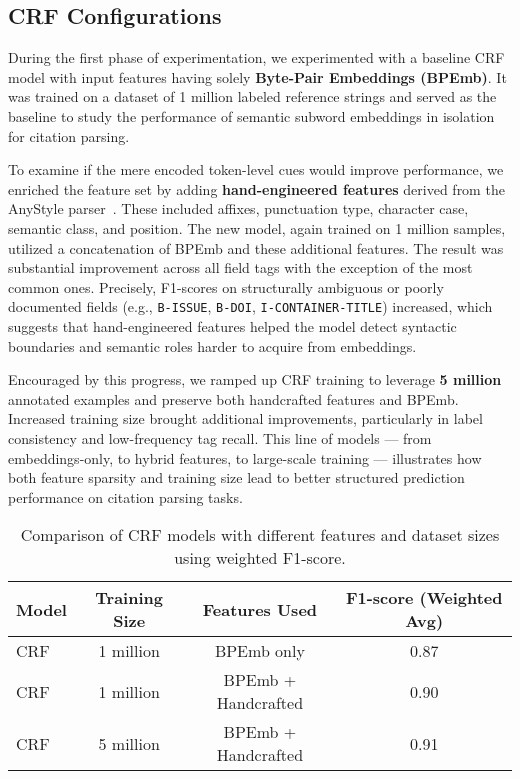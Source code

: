 \subsection{CRF Configurations}
During the first phase of experimentation, we experimented with a baseline CRF model with input features having solely \textbf{Byte-Pair Embeddings (BPEmb)}. It was trained on a dataset of 1 million labeled reference strings and served as the baseline to study the performance of semantic subword embeddings in isolation for citation parsing.

To examine if the mere encoded token-level cues would improve performance, we enriched the feature set by adding \textbf{hand-engineered features} derived from the AnyStyle parser~\cite{anystyle}. These included affixes, punctuation type, character case, semantic class, and position. The new model, again trained on 1 million samples, utilized a concatenation of BPEmb and these additional features.
The result was substantial improvement across all field tags with the exception of the most common ones. Precisely, F1-scores on structurally ambiguous or poorly documented fields (e.g., \texttt{B-ISSUE}, \texttt{B-DOI}, \texttt{I-CONTAINER-TITLE}) increased, which suggests that hand-engineered features helped the model detect syntactic boundaries and semantic roles harder to acquire from embeddings.

Encouraged by this progress, we ramped up CRF training to leverage \textbf{5 million} annotated examples and preserve both handcrafted features and BPEmb. Increased training size brought additional improvements, particularly in label consistency and low-frequency tag recall.
This line of models — from embeddings-only, to hybrid features, to large-scale training — illustrates how both feature sparsity and training size lead to better structured prediction performance on citation parsing tasks.
\begin{table}[h]
    \centering
    \begin{tabular}{|l|c|c|c|}
    \hline
    \textbf{Model} & \textbf{Training Size} & \textbf{Features Used} & \textbf{F1-score (Weighted Avg)} \\
    \hline
    CRF & 1 million & BPEmb only & 0.87 \\
    CRF & 1 million & BPEmb + Handcrafted & 0.90 \\
    CRF & 5 million & BPEmb + Handcrafted & 0.91 \\
    \hline
    \end{tabular}
    \caption{Comparison of CRF models with different features and dataset sizes using weighted F1-score.}
    \label{tab:crf_comparison}
\end{table}

